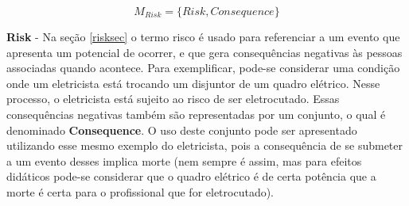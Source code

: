 \begin{equation}
    M_{Risk} = \{ Risk, Consequence \}
\end{equation}

\textbf{Risk} - Na seção \ref{risksec} o termo risco é usado para referenciar a um evento que apresenta um potencial de ocorrer, e que gera consequências negativas às pessoas associadas quando acontece. Para exemplificar, pode-se considerar uma condição onde um eletricista está trocando um disjuntor de um quadro elétrico. Nesse processo, o eletricista está sujeito ao risco de ser eletrocutado. Essas consequências negativas também são representadas por um conjunto, o qual é denominado \textbf{Consequence}. O uso deste conjunto pode ser apresentado utilizando esse mesmo exemplo do eletricista, pois a consequência de se submeter a um evento desses implica morte (nem sempre é assim, mas para efeitos didáticos pode-se considerar que o quadro elétrico é de certa potência que a morte é certa para o profissional que for eletrocutado).